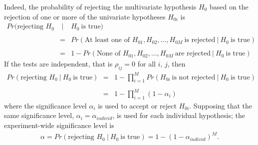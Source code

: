 \documentclass[letterpaper,12pt,oneside,final]{article}
\newcommand{\given}{~\vert~}
\begin{document}
Indeed, the probability of rejecting the multivariate hypothesis $H_0$ based on the rejection of one or more of the univariate hypotheses $H_{0i}$ is
\[
\begin{array}{rcl} 
Pr(\mbox{rejecting } H_0 &\given& H_0 ~\mbox{is true} ) \\
&&\\
&=& 
Pr(\mbox{At least one of } H_{01}, H_{02}, \ldots, H_{0M} ~\mbox{is rejected} \given  H_0 ~\mbox{is true} ) \\
&&\\
&=& 
1 - Pr(\mbox{None of } H_{01}, H_{02}, \ldots, H_{0M} ~\mbox{are rejected} \given  H_0 ~\mbox{is true} )
\end{array}
\]
If the tests are independent, that is $\rho_{ij} = 0$ for all $i$, $j$, then 
\[
\begin{array}{rcl} 
Pr(\mbox{rejecting } H_0 \given H_0 ~\mbox{is true} ) &=&
1 - \prod_{i=1}^M Pr(H_{0i}~ \mbox{is not rejected} \given  H_0 ~\mbox{is true} )\\
&&\\
&=& 
1 - \prod_{i=1}^M (1 - \alpha_i)
\end{array}
\]
where the significance level $\alpha_i$ is used to accept or reject $H_{0i}$.  
Supposing that the same significance level,  $\alpha_i = \alpha_{individ}$,  
is used for each individual hypothesis; the experiment-wide significance level is
\begin{equation}
\begin{array}{rcl} 
\alpha = Pr(\mbox{rejecting } H_0 \given H_0 ~\mbox{is true} ) = 
1 -  (1 - \alpha_{individ})^M.
\end{array}
\label{eq:multipleTesting:alphaExperiment}
\end{equation}
\end{document}
